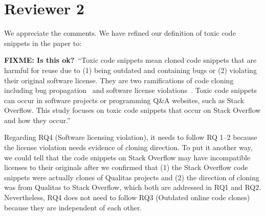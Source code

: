 \documentclass[a4paper,twoside,10pt]{reviewresponse}
\newcommand\FIXME[1]{{\color{red}\textbf{FIXME: #1}}}
\begin{document}
\section{Reviewer 2}


We appreciate the comments. We have refined our definition of toxic code snippets in the paper to:

\FIXME{Is this ok?}~``Toxic code snippets mean cloned code snippets that
are harmful for reuse due to (1) being outdated and containing bugs or (2) violating their original software license. They are two ramifications of code cloning
including bug propagation~\citep{Bellon2007}
and software license violations~\citep{An2017}.
Toxic code snippets can occur in software projects or programming Q\&A websites, such
as Stack Overflow.
This study focuses on toxic code snippets that occur on Stack Overflow and how they occur.''
 

Regarding RQ4 (Software licensing violation), it needs to follow RQ 1--2 because the license violation needs evidence of cloning direction. To put it another way, we could tell that the code snippets on Stack Overflow may have incompatible licenses to their originals after we confirmed that (1) the Stack Overflow code snippets were actually clones of Qualitas projects and (2) the direction of cloning was from Qualitas to Stack Overflow, which both are addressed in RQ1 and RQ2.
Nevertheless, RQ4 does not need to follow RQ3 (Outdated online code clones) because they are independent of each other.
\end{document}
